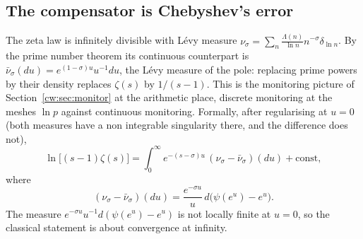 \subsection{The compensator is Chebyshev's error}
The zeta law is infinitely divisible with L\'evy measure $\nu_\sigma=\sum_n\frac{\Lambda(n)}{\ln n}n^{-\sigma}\delta_{\ln n}$. By the prime number theorem its continuous counterpart is $\bar\nu_\sigma(du)=e^{(1-\sigma)u}u^{-1}du$, the L\'evy measure of the pole: replacing prime powers by their density replaces $\zeta(s)$ by $1/(s-1)$. This is the monitoring picture of Section~\ref{cw:sec:monitor} at the arithmetic place, discrete monitoring at the meshes $\ln p$ against continuous monitoring. Formally, after regularising at $u=0$ (both measures have a non integrable singularity there, and the difference does not),
\[
\ln\big[(s-1)\zeta(s)\big]=\int_0^\infty e^{-(s-\sigma)u}\,(\nu_\sigma-\bar\nu_\sigma)(du)+\text{const},
\]
where
\[
(\nu_\sigma-\bar\nu_\sigma)(du)=\frac{e^{-\sigma u}}{u}\,d\big(\psi(e^u)-e^u\big).
\]
The measure $e^{-\sigma u}u^{-1}d(\psi(e^u)-e^u)$ is not locally finite at $u=0$, so the classical statement is about convergence at infinity.

